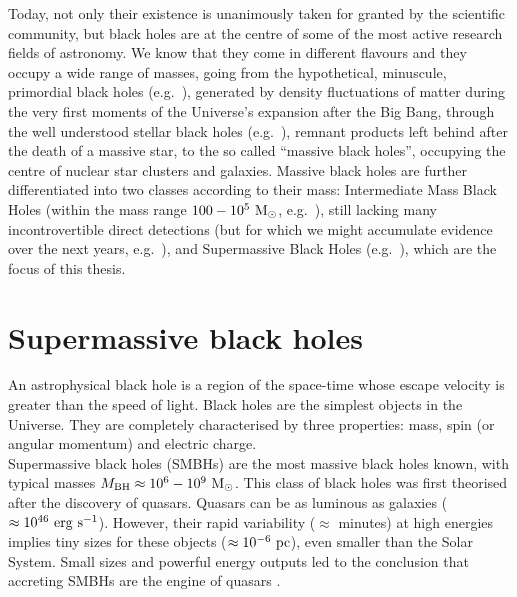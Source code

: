 Today, not only their existence is unanimously taken for granted by the scientific community, 
but black holes are at the centre of some of the most active research fields of astronomy. 
We know that they come in different flavours and they occupy a wide range of masses, 
going from the hypothetical, minuscule, primordial black holes (e.g.~\citealt{carrhawking1974}), 
generated by density fluctuations of matter during the very first moments of the Universe's expansion 
after the Big Bang, 
through the well understood stellar black holes (e.g.~\citealt{shahbaz1999}), 
remnant products left behind after the death of a massive star, 
to the so called ``massive black holes'', 
occupying the centre of nuclear star clusters and galaxies. 
Massive black holes are further differentiated into two classes according to their mass: 
Intermediate Mass Black Holes (within the mass range $100 - 10^5~\rm M_\odot$, e.g.~\citealt{millercolbert2004,vandermarel2004}), 
still lacking many incontrovertible direct detections 
(but for which we might accumulate evidence over the next years, e.g.~\citealt{pasham2014}), 
and Supermassive Black Holes (e.g.~\citealt{ferrarese2006book}), 
which are the focus of this thesis. 


\section{Supermassive black holes} 
An astrophysical black hole is a region of the space-time whose escape velocity is greater than the speed of light.
Black holes are the simplest objects in the Universe. 
They are completely characterised by three properties: mass, spin (or angular momentum) and electric charge. \\

Supermassive black holes (SMBHs) are the most massive black holes known, with typical masses  
$M_{\rm BH} \approx 10^6 - 10^9~\rm M_{\odot}$.
This class of black holes was first theorised \citep{lynden-bell1969,wolfeburbidge1970} after the discovery of quasars.
Quasars can be as luminous as galaxies ($\approx 10^{46}~\rm erg~s^{-1}$).
However, their rapid variability ($\approx$ minutes) at high energies implies tiny sizes for these objects 
($\approx 10^{-6}~\rm pc$), even smaller than the Solar System.
Small sizes and powerful energy outputs led to the conclusion that accreting SMBHs are the engine of quasars
\citep{salpeter1964,zeldovichnovikov1964,lynden-bell1978}. \\


